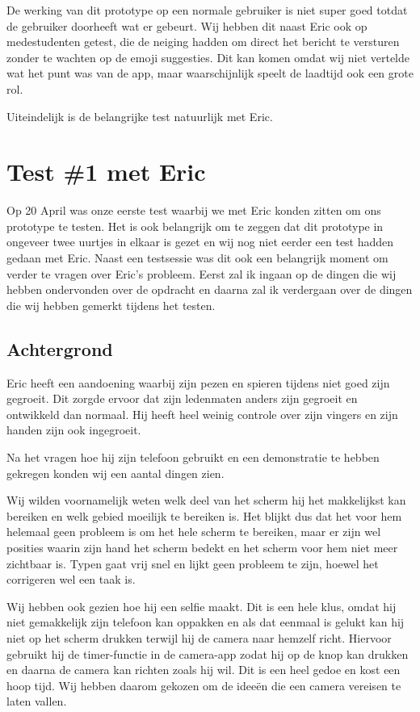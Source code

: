 \documentclass[12pt]{article}
\begin{document}
De werking van dit prototype op een normale gebruiker is niet super goed totdat de gebruiker doorheeft wat er gebeurt.
Wij hebben dit naast Eric ook op medestudenten getest, die de neiging hadden om direct het bericht te versturen zonder te wachten op de emoji suggesties.
Dit kan komen omdat wij niet vertelde wat het punt was van de app, maar waarschijnlijk speelt de laadtijd ook een grote rol.

Uiteindelijk is de belangrijke test natuurlijk met Eric.

\section{Test \#1 met Eric}

Op 20 April was onze eerste test waarbij we met Eric konden zitten om ons prototype te testen.
Het is ook belangrijk om te zeggen dat dit prototype in ongeveer twee uurtjes in elkaar is gezet en wij nog niet eerder een test hadden gedaan met Eric.
Naast een testsessie was dit ook een belangrijk moment om verder te vragen over Eric's probleem.
Eerst zal ik ingaan op de dingen die wij hebben ondervonden over de opdracht en daarna zal ik verdergaan over de dingen die wij hebben gemerkt tijdens het testen.

\subsection{Achtergrond}

Eric heeft een aandoening waarbij zijn pezen en spieren tijdens niet goed zijn gegroeit.
Dit zorgde ervoor dat zijn ledenmaten anders zijn gegroeit en ontwikkeld dan normaal.
Hij heeft heel weinig controle over zijn vingers en zijn handen zijn ook ingegroeit.

Na het vragen hoe hij zijn telefoon gebruikt en een demonstratie te hebben gekregen konden wij een aantal dingen zien.

Wij wilden voornamelijk weten welk deel van het scherm hij het makkelijkst kan bereiken en welk gebied moeilijk te bereiken is.
Het blijkt dus dat het voor hem helemaal geen probleem is om het hele scherm te bereiken, maar er zijn wel posities waarin zijn hand het scherm bedekt en het scherm voor hem niet meer zichtbaar is.
Typen gaat vrij snel en lijkt geen probleem te zijn, hoewel het corrigeren wel een taak is.

Wij hebben ook gezien hoe hij een selfie maakt.
Dit is een hele klus, omdat hij niet gemakkelijk zijn telefoon kan oppakken en als dat eenmaal is gelukt kan hij niet op het scherm drukken terwijl hij de camera naar hemzelf richt.
Hiervoor gebruikt hij de timer-functie in de camera-app zodat hij op de knop kan drukken en daarna de camera kan richten zoals hij wil.
Dit is een heel gedoe en kost een hoop tijd.
Wij hebben daarom gekozen om de ideeën die een camera vereisen te laten vallen.
\end{document}
